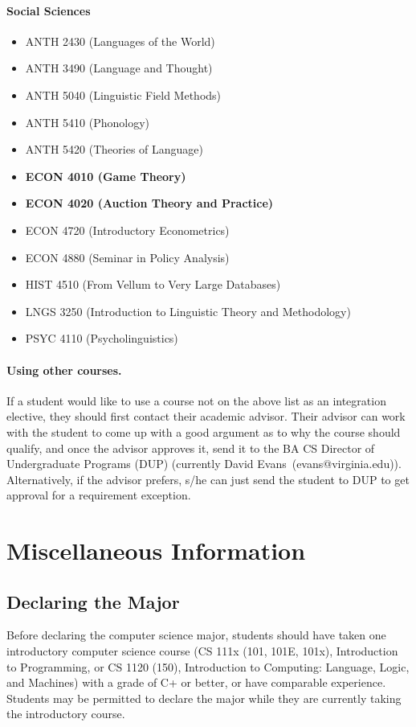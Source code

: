 \documentclass[10pt,letter]{book}
\makeatletter
\newenvironment{itemlist}{
\begin{itemize}
\setlength{\itemsep}{0pt}
\setlength{\parskip}{0pt}}
{\end{itemize}}
\newcommand{\badup}{David Evans}
\newcommand{\badupemail}{evans@virginia.edu}
\newcommand{\mysection}[1]{\section{#1}\renewcommand{\rightmark}{#1}}
\makeatother
\begin{document}
\paragraph{Social Sciences}
\begin{itemlist}
\item ANTH 2430 (Languages of the World)
\item ANTH 3490 (Language and Thought)
\item ANTH 5040 (Linguistic Field Methods)
\item ANTH 5410 (Phonology)
\item ANTH 5420 (Theories of Language)
\item {\bf ECON 4010 (Game Theory)}
\item {\bf ECON 4020 (Auction Theory and Practice)}
\item ECON 4720 (Introductory Econometrics)
\item ECON 4880 (Seminar in Policy Analysis)
\item HIST 4510 (From Vellum to Very Large Databases)
\item LNGS 3250 (Introduction to Linguistic Theory and Methodology)
\item PSYC 4110 (Psycholinguistics)
\end{itemlist}

\paragraph{Using other courses.}  If a student would like to use a
course not on the above list as an integration elective, they should
first contact their academic advisor.  Their advisor can work with the
student to come up with a good argument as to why the course should
qualify, and once the advisor approves it, send it to the BA CS
Director of Undergraduate Programs (DUP) (currently
\badup\ (\badupemail)).  Alternatively, if the advisor prefers, s/he
can just send the student to DUP to get approval for a requirement
exception.

\mysection{Miscellaneous Information}

\subsection{Declaring the Major}

Before declaring the computer science major, students should have
taken one introductory computer science course (CS 111x (101, 101E,
101x), Introduction to Programming, or CS 1120 (150), Introduction to
Computing: Language, Logic, and Machines) with a grade of C+ or
better, or have comparable experience. Students may be permitted to
declare the major while they are currently taking the introductory
course.
\end{document}
